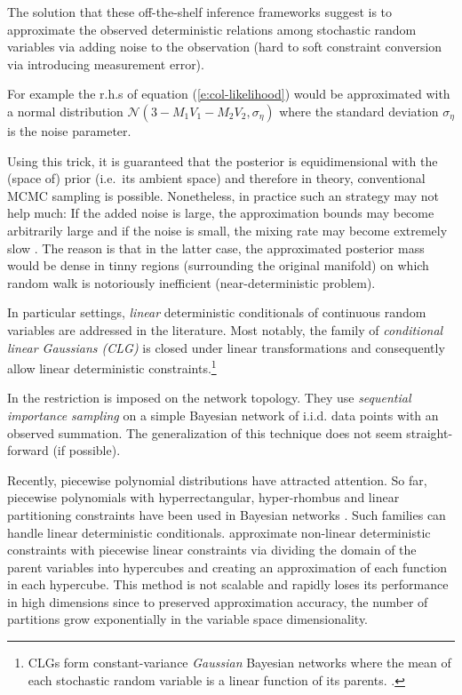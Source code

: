 \documentclass{article}
\begin{document}
The solution that these off-the-shelf inference frameworks suggest is to approximate the observed deterministic relations among  stochastic random variables via adding noise to the observation 
(hard to soft constraint conversion via introducing measurement error).

For example the r.h.s of equation (\ref{e:col-likelihood}) would be 
approximated with a normal distribution
{\footnotesize $\mathcal{N}(3 - M_1 V_1 - M_2 V_2, \sigma_\eta)$}  
where the standard deviation $\sigma_\eta$ is the noise parameter.

Using this trick, it is guaranteed that the posterior is equidimensional with the (space of) prior (i.e.\ its ambient space) and therefore in theory, conventional MCMC sampling is possible.
Nonetheless, in practice such an strategy may not help much:
If the added noise is large, 
the approximation bounds may become arbitrarily large
and if the noise is small, 
the mixing rate may become extremely slow \cite{chin1987bayesian}. 
The reason is that in the latter case, 
 the approximated posterior mass would be dense in tinny regions (surrounding the original manifold) on which random walk
is notoriously inefficient (near-deterministic problem).  

In particular settings, \emph{linear} deterministic conditionals of continuous random variables
are addressed in the literature.  
Most notably, 
the family of \emph{conditional linear Gaussians (CLG)} \cite{lauritzen2001stable}
is closed under linear transformations and consequently
allow linear deterministic constraints.\footnote{CLGs form constant-variance \emph{Gaussian} Bayesian networks where the mean of each stochastic random variable is a linear function of its parents. \cite{lauritzen2001stable}.
}

In \cite{li2013dynamic} the restriction is imposed on the network topology.
They use \emph{sequential importance sampling} on a simple Bayesian network of i.i.d. data points with an observed summation.%
The generalization of this technique does not seem straight-forward (if possible).

Recently, piecewise polynomial distributions have attracted attention.
So far, piecewise polynomials with hyperrectangular, hyper-rhombus and linear partitioning constraints have been used in Bayesian networks \cite{shenoy2011inference,shenoy2012two,Sanner:12}.
Such families can handle linear deterministic conditionals.
\cite{cobb2005nonlinear} approximate non-linear deterministic constraints with piecewise linear constraints via
dividing the domain of the parent variables into hypercubes and creating an
approximation of each function in each hypercube.
This method is not scalable and rapidly loses its performance in high dimensions since to preserved approximation accuracy, the number of partitions grow exponentially in the variable space dimensionality. 
\end{document}
